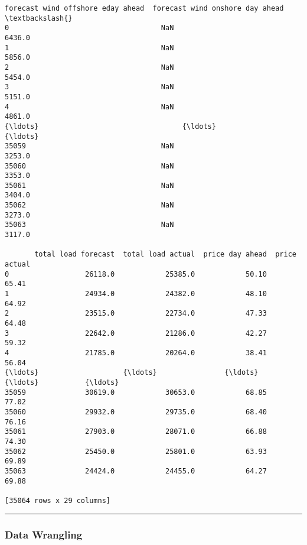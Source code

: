 \documentclass[11pt]{article}
\begin{document}
\begin{tcolorbox}[breakable, size=fbox, boxrule=.5pt, pad at break*=1mm, opacityfill=0]
\begin{Verbatim}[commandchars=\\\{\}]
       forecast wind offshore eday ahead  forecast wind onshore day ahead  \textbackslash{}
0                                    NaN                           6436.0
1                                    NaN                           5856.0
2                                    NaN                           5454.0
3                                    NaN                           5151.0
4                                    NaN                           4861.0
{\ldots}                                  {\ldots}                              {\ldots}
35059                                NaN                           3253.0
35060                                NaN                           3353.0
35061                                NaN                           3404.0
35062                                NaN                           3273.0
35063                                NaN                           3117.0

       total load forecast  total load actual  price day ahead  price actual
0                  26118.0            25385.0            50.10         65.41
1                  24934.0            24382.0            48.10         64.92
2                  23515.0            22734.0            47.33         64.48
3                  22642.0            21286.0            42.27         59.32
4                  21785.0            20264.0            38.41         56.04
{\ldots}                    {\ldots}                {\ldots}              {\ldots}           {\ldots}
35059              30619.0            30653.0            68.85         77.02
35060              29932.0            29735.0            68.40         76.16
35061              27903.0            28071.0            66.88         74.30
35062              25450.0            25801.0            63.93         69.89
35063              24424.0            24455.0            64.27         69.88

[35064 rows x 29 columns]
\end{Verbatim}
\end{tcolorbox}
        
    \begin{center}\rule{0.5\linewidth}{0.5pt}\end{center}

\hypertarget{data-wrangling}{%
\subsubsection{Data Wrangling}\label{data-wrangling}}
\end{document}
